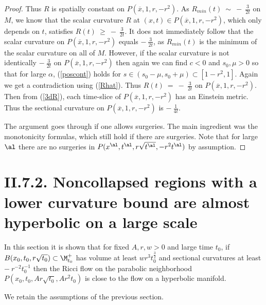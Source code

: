 \begin{proof}
Thus $R$ is spatially constant on
$P(\overline{x}, 1, r, -r^2)$.
As $R_{min}(t) \: \sim \: - \: \frac{3}{2t}$ on $M$, we know that the
scalar curvature $R$ at $(x,t) \in P(\overline{x}, 1, r, -r^2)$, which
only depends on $t$, satisfies
$R(t) \: \ge \: - \: \frac{3}{2t}$. It does not immediately follow that
the scalar curvature on $P(\overline{x}, 1, r, -r^2)$
equals $- \: \frac{3}{2t}$,  as $R_{min}(t)$ is the minimum of
the scalar curvature on all of $M$. However, if the scalar curvature is not identically
$- \: \frac{3}{2t}$ on $P(\overline{x}, 1, r, -r^2)$ then
again we can find $c<0$ and $s_0, \mu > 0$ so that
for large $\alpha$, (\ref{poscont}) holds for
$s \in (s_0-\mu, s_0 +\mu) \subset [1-r^2, 1]$.
Again we get a contradiction using (\ref{Rhat}).  Thus
$R(t) \: = \: - \: \frac{3}{2t}$ on $P(\overline{x}, 1, r, -r^2)$.
Then from (\ref{3dR}),
each time-slice of $P(\overline{x}, 1, r, -r^2)$
has an Einstein metric.  Thus the sectional curvature on
$P(\overline{x}, 1, r, -r^2)$ is $- \: \frac{1}{4t}$.


The argument goes through if one allows surgeries.
The main ingredient was the monotonicity formulas, which
still hold if there are surgeries. Note that for large
$\al$ there are no surgeries in $P(x^\al, t^\al, r \sqrt{t^\al}, - r^2 t^\al)$
by assumption.
\end{proof}

\section{II.7.2. Noncollapsed regions with a lower curvature bound are
almost hyperbolic on a large scale}

In this section it is shown that for fixed $A, r,w > 0$ and large time $t_0$, if
$B(x_0, t_0, r \sqrt{t_0}) \subset \M_{t_0}^+$ has volume at least
$wr^3 t_0^{\frac32}$ and sectional curvatures at least
$- \: r^{-2} t_0^{-1}$ then the Ricci flow on the parabolic neighborhood
$P(x_0, t_0, Ar \sqrt{t_0}, A r^2 t_0)$ is close to the flow on a
hyperbolic manifold.

We retain the assumptions of the previous section.

